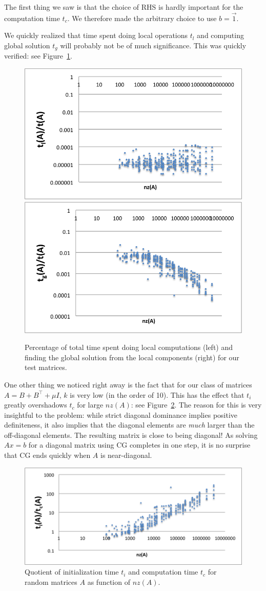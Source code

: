 \documentclass[11pt]{amsart}
\theoremstyle{definition}
\begin{document}
The first thing we saw is that the choice of RHS is hardly important for the computation time $t_c$. We therefore made the arbitrary choice to use $b = \vec 1$.

We quickly realized that time spent doing local operations $t_l$ and computing global solution $t_g$ will probably not be of much significance. This was quickly verified: see Figure~\ref{fig:nonsig}.
\begin{figure}
  \includegraphics[width=0.49\linewidth]{tlt.png}
  \includegraphics[width=0.49\linewidth]{tgt.png}
  \caption{Percentage of total time spent doing local computations (left) and finding the global solution from the local components (right) for our test matrices.}
  \label{fig:nonsig}
\end{figure}

One other thing we noticed right away is the fact that for our class of matrices $A = B + B^\top + \mu I$, $k$ is very low (in the order of 10). This has the effect that $t_i$ greatly overshadows $t_c$ for large $nz(A)$: see Figure~\ref{fig:quotient}. The reason for this is very insightful to the problem: while strict diagonal dominance implies positive definiteness, it also implies that the diagonal elements are \emph{much} larger than the off-diagonal elements. The resulting matrix is close to being diagonal! As solving $Ax=b$ for a diagonal matrix using CG completes in one step, it is no surprise that CG ends quickly when $A$ is near-diagonal.

\begin{figure}
  \includegraphics[width=\linewidth]{quotient.png}
  \caption{Quotient of initialization time $t_i$ and computation time $t_c$ for random matrices $A$ as function of $nz(A)$.}
  \label{fig:quotient}
\end{figure}
\end{document}
